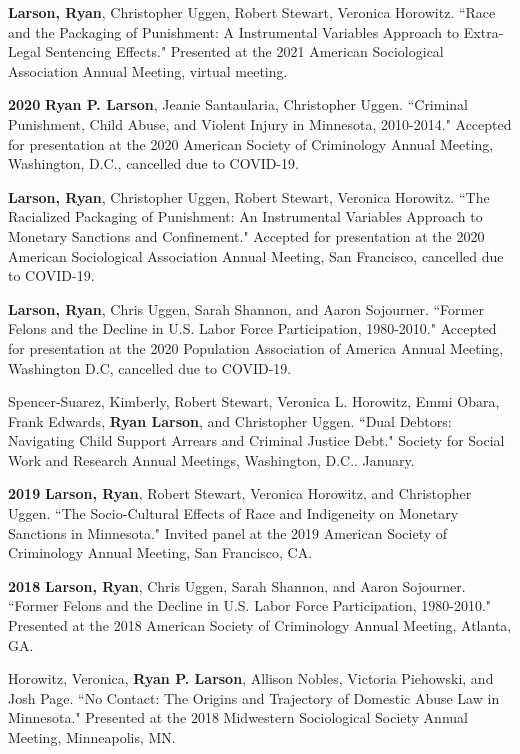 \documentclass[letterpaper]{article}
\newenvironment{publist}{%
  \begin{list}{}{%
    \setlength{\leftmargin}{0cm}   %
    \setlength{\labelwidth}{2cm}     %
    \setlength{\labelsep}{0.5cm}     %
  }%
}{%
  \end{list}%
}
\begin{document}
\begin{publist}
\item \textbf{Larson, Ryan}, Christopher Uggen, Robert Stewart, Veronica Horowitz. ``Race and the Packaging of Punishment: A Instrumental Variables Approach to Extra-Legal Sentencing Effects." Presented at the 2021 American Sociological Association Annual Meeting, virtual meeting. 

\item[\textbf{2020}] \textbf{Ryan P. Larson}, Jeanie Santaularia, Christopher Uggen. ``Criminal Punishment, Child Abuse, and Violent Injury in Minnesota, 2010-2014." Accepted for presentation at the 2020 American Society of Criminology Annual Meeting, Washington, D.C., cancelled due to COVID-19.  

\item \textbf{Larson, Ryan}, Christopher Uggen, Robert Stewart, Veronica Horowitz. ``The Racialized Packaging of Punishment: An Instrumental Variables Approach to Monetary Sanctions and Confinement." Accepted for presentation at the 2020 American Sociological Association Annual Meeting, San Francisco, cancelled due to COVID-19. 

\item \textbf{Larson, Ryan}, Chris Uggen, Sarah Shannon, and Aaron Sojourner. ``Former Felons and the Decline in U.S. Labor Force Participation, 1980-2010." Accepted for presentation at the 2020 Population Association of America Annual Meeting, Washington D.C, cancelled due to COVID-19. 

\item Spencer-Suarez, Kimberly, Robert Stewart, Veronica L. Horowitz, Emmi Obara, Frank Edwards, \textbf{Ryan Larson}, and Christopher Uggen. ``Dual Debtors: Navigating Child Support Arrears and Criminal Justice Debt." Society for Social Work and Research Annual Meetings, Washington, D.C.. January.

\item[\textbf{2019}] \textbf{Larson, Ryan}, Robert Stewart, Veronica Horowitz, and Christopher Uggen. ``The Socio-Cultural Effects of Race and Indigeneity on Monetary Sanctions in Minnesota." Invited panel at the 2019 American Society of Criminology Annual Meeting, San Francisco, CA.

\item[\textbf{2018}] \textbf{Larson, Ryan}, Chris Uggen, Sarah Shannon, and Aaron Sojourner. ``Former Felons and the Decline in U.S. Labor Force Participation, 1980-2010." Presented at the 2018 American Society of Criminology Annual Meeting, Atlanta, GA. 
\item Horowitz, Veronica, \textbf{Ryan P. Larson}, Allison Nobles, Victoria Piehowski, and Josh Page. ``No Contact: The Origins and Trajectory of Domestic Abuse Law in Minnesota." Presented at the 2018 Midwestern Sociological Society Annual Meeting, Minneapolis, MN. 


\end{publist}
\end{document}
